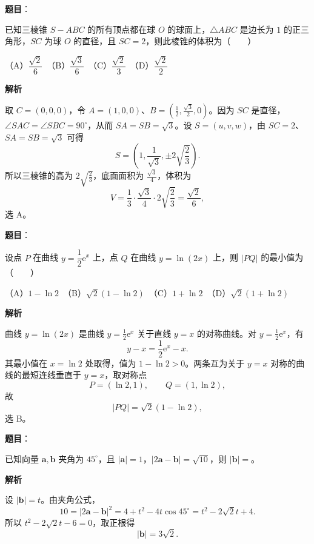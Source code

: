 \begin{answer}

\textbf{题目}：

已知三棱锥 $S-ABC$ 的所有顶点都在球 $O$ 的球面上，$\triangle ABC$ 是边长为 $1$ 的正三角形，$SC$ 为球 $O$ 的直径，且 $SC=2$，则此棱锥的体积为\mbox{（　　）}

（A）$\dfrac{\sqrt2}{6}$　（B）$\dfrac{\sqrt3}{6}$　（C）$\dfrac{\sqrt2}{3}$　（D）$\dfrac{\sqrt2}{2}$

\textbf{解析}

取 $C=(0,0,0)$，令 $A=(1,0,0)$、$B=(\frac12,\frac{\sqrt3}{2},0)$。因为 $SC$ 是直径，$\angle SAC=\angle SBC=90^\circ$，从而 $SA=SB=\sqrt3$。设 $S=(u,v,w)$，由 $SC=2$、$SA=SB=\sqrt3$ 可得
\nopagebreak[4]
\[
S=\left(1,\frac1{\sqrt3},\pm2\sqrt{\frac23}\right).
\]
所以三棱锥的高为 $2\sqrt{\frac23}$，底面面积为 $\frac{\sqrt3}{4}$，体积为
\nopagebreak[4]
\[
V=\frac13\cdot\frac{\sqrt3}{4}\cdot2\sqrt{\frac23}
=\frac{\sqrt2}{6},
\]
选 A。


\end{answer}
\begin{answer}

\textbf{题目}：

设点 $P$ 在曲线 $y=\dfrac12\mathrm e^x$ 上，点 $Q$ 在曲线 $y=\ln(2x)$ 上，则 $|PQ|$ 的最小值为\mbox{（　　）}

（A）$1-\ln2$　（B）$\sqrt2(1-\ln2)$　（C）$1+\ln2$　（D）$\sqrt2(1+\ln2)$

\textbf{解析}

曲线 $y=\ln(2x)$ 是曲线 $y=\frac12\mathrm e^x$ 关于直线 $y=x$ 的对称曲线。对 $y=\frac12\mathrm e^x$，有
\nopagebreak[4]
\[
y-x=\frac12\mathrm e^x-x.
\]
其最小值在 $x=\ln2$ 处取得，值为 $1-\ln2>0$。两条互为关于 $y=x$ 对称的曲线的最短连线垂直于 $y=x$，取对称点
\nopagebreak[4]
\[
P=(\ln2,1),\qquad Q=(1,\ln2),
\]
故
\nopagebreak[4]
\[
|PQ|=\sqrt2(1-\ln2),
\]
选 B。


\end{answer}
\begin{answer}

\textbf{题目}：

已知向量 $\boldsymbol a,\boldsymbol b$ 夹角为 $45^\circ$，且 $|\boldsymbol a|=1$，$|2\boldsymbol a-\boldsymbol b|=\sqrt{10}$，则 $|\boldsymbol b|=$\gkblank{}。

\textbf{解析}

设 $|\boldsymbol b|=t$。由夹角公式，
\nopagebreak[4]
\[
10=|2\boldsymbol a-\boldsymbol b|^2
=4+t^2-4t\cos45^\circ
=t^2-2\sqrt2t+4.
\]
所以 $t^2-2\sqrt2t-6=0$，取正根得
\nopagebreak[4]
\[
|\boldsymbol b|=3\sqrt2.
\]


\end{answer}
